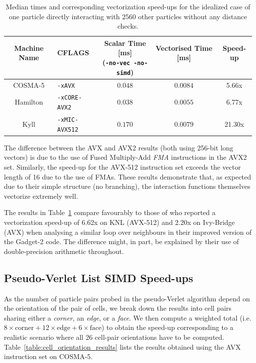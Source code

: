 \documentclass{IOS-Book-Article}
\newcommand{\gadget}{{\sc Gadget-2}\xspace}
\begin{document}
\begin{table}[h]
  \centering
   \caption{Median times and corresponding vectorization speed-ups for the idealized case of one particle directly interacting with $2560$ other particles without any distance checks.}
  \label{table:raw_interaction_results}
  \begin{tabular}{ clccc } 
    \hline
    \hline
    \makecell{Machine Name\\~} & \makecell{CFLAGS\\~} & \makecell{Scalar Time [ms] \\ (\texttt{-no-vec -no-simd})} & \makecell{Vectorised Time [ms] \\ ~} & \makecell{Speed-up\\~} \\ 
    \hline
    COSMA-5 & \texttt{-xAVX}          & $0.048$ & $0.0084$ & 5.66x \\
    Hamilton & \texttt{-xCORE-AVX2}    & $0.038$ & $0.0055$ & 6.77x \\ 
    Kyll & \texttt{-xMIC-AVX512}   & $0.170$ & $0.0079$ & 21.30x  \\ 
    \hline
    \hline
  \end{tabular}
\end{table}

The difference between the AVX and AVX2 results (both using 256-bit long vectors) is due to the use of Fused Multiply-Add {\em FMA} instructions in the AVX2 set. Similarly, the speed-up for the AVX-512 instruction set exceeds the vector length of 16 due to the use of FMAs.
These results demonstrate that, as expected due to their simple structure (no branching), the interaction functions themselves vectorize extremely well.

The results in Table~\ref{table:raw_interaction_results} compare favourably to those of \cite{ref:Luigi_Gadget} who reported a vectorization speed-up of 6.62x on KNL (AVX-512) and 2.20x on Ivy-Bridge (AVX) when analysing a similar loop over neighbours in their improved version of the \gadget code\cite{ref:Gadget}. The difference might, in part, be explained by their use of double-precision arithmetic throughout.

\subsection{Pseudo-Verlet List SIMD Speed-ups}

As the number of particle pairs probed in the pseudo-Verlet algorithm depend on the orientation of the pair of cells, we break down the results into cell pairs sharing either a {\em corner}, an {\em edge}, or a {\em face}. We then compute a weighted total (i.e. $8\times\mathrm{corner}+12\times\mathrm{edge}+6\times\mathrm{face}$) to obtain the speed-up corresponding to a realistic scenario where all 26 cell-pair orientations have to be computed. Table~\ref{table:cell_orientation_results} lists the results obtained using the AVX instruction set on COSMA-5.
\end{document}
